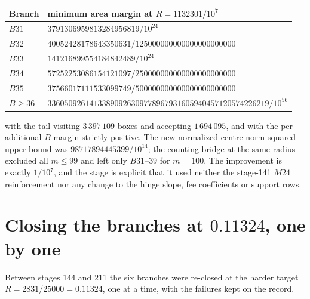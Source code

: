 \begin{center}
\footnotesize
\begin{tabular}{@{}ll@{}}
\toprule
Branch & minimum area margin at $R=1132301/10^{7}$ \\
\midrule
$B31$ & $3791306959813284956819/10^{24}$ \\
$B32$ & $40052428178643350631/125000000000000000000000$ \\
$B33$ & $141216899554184842489/10^{24}$ \\
$B34$ & $57252253086154121097/250000000000000000000000$ \\
$B35$ & $37566017111533099749/500000000000000000000000$ \\
$B\ge36$ & $33605092614133890926309778967931605940457120574226219/10^{56}$ \\
\bottomrule
\end{tabular}
\end{center}

with the tail visiting $3\,397\,109$ boxes and accepting $1\,694\,095$, and with the per-additional-$B$
margin strictly positive. The new normalized centre-norm-squared upper bound was
$98717894445399/10^{14}$; the counting bridge at the same radius excluded all $m\le99$ and left only
$B31$--$39$ for $m=100$. The improvement is exactly $1/10^{7}$, and the stage is explicit that it
used neither the stage-141 $M24$ reinforcement nor any change to the hinge slope, fee coefficients
or support rows.

\section{Closing the branches at $0.11324$, one by one}

Between stages 144 and 211 the six branches were re-closed at the harder target
$R=2831/25000=0.11324$, one at a time, with the failures kept on the record.

